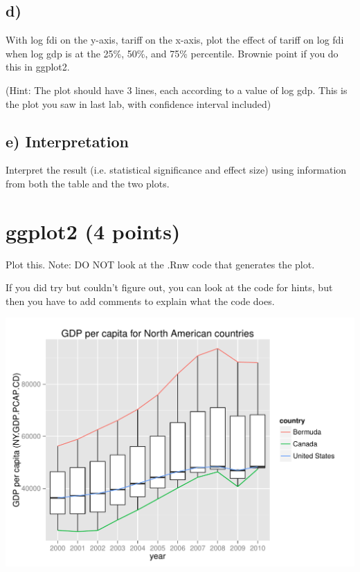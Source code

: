 \documentclass{article}\usepackage[]{graphicx}\usepackage[]{color}
\makeatletter
\def\maxwidth{ %
  \ifdim\Gin@nat@width>\linewidth
    \linewidth
  \else
    \Gin@nat@width
  \fi
}
\newenvironment{knitrout}{}{} %
\makeatother
\begin{document}
\subsection*{d)}

With log fdi on the y-axis, tariff on the x-axis, plot the effect of tariff on log fdi when log gdp is at the 25\%, 50\%, and 75\% percentile. Brownie point if you do this in ggplot2.

(Hint: The plot should have 3 lines, each according to a value of log gdp. This is the plot you saw in last lab, with confidence interval included)

\subsection*{e) Interpretation}

Interpret the result (i.e. statistical significance and effect size) using information from both the table and the two plots.

\section{ggplot2 (4 points)}

Plot this. Note: DO NOT look at the .Rnw code that generates the plot.

If you did try but couldn't figure out, you can look at the code for hints, but then you have to add comments to explain what the code does.

\begin{knitrout}
\color{fgcolor}
\includegraphics[width=\maxwidth]{figure/unnamed-chunk-1-1} 

\end{knitrout}
\end{document}
